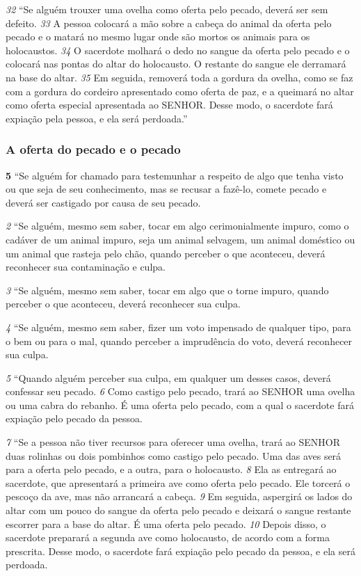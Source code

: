 \smallskip
\textit{\tiny 32}
“Se alguém trouxer uma ovelha como oferta pelo pecado, deverá ser sem
defeito. 
\textit{\tiny 33}
A pessoa colocará a mão sobre a cabeça do animal da oferta pelo
pecado e o matará no mesmo lugar onde são mortos os animais para os
holocaustos. 
\textit{\tiny 34}
O sacerdote molhará o dedo no sangue da oferta pelo pecado e o
colocará nas pontas do altar do holocausto. O restante do sangue ele derramará
na base do altar. 
\textit{\tiny 35}
Em seguida, removerá toda a gordura da ovelha, como se faz
com a gordura do cordeiro apresentado como oferta de paz, e a queimará no altar
como oferta especial apresentada ao SENHOR. Desse modo, o sacerdote fará
expiação pela pessoa, e ela será perdoada.”

\bigskip
\subsubsection*{A oferta do pecado e o pecado}
\textbf{\large 5} “Se alguém for chamado para testemunhar a respeito de algo que tenha visto
ou que seja de seu conhecimento, mas se recusar a fazê-lo, comete pecado e
deverá ser castigado por causa de seu pecado. 

\smallskip
\textit{\tiny 2} 
“Se alguém, mesmo sem saber, tocar em algo cerimonialmente impuro, como
o cadáver de um animal impuro, seja um animal selvagem, um animal doméstico
ou um animal que rasteja pelo chão, quando perceber o que aconteceu, deverá
reconhecer sua contaminação e culpa. 

\smallskip
\textit{\tiny 3} 
“Se alguém, mesmo sem saber, tocar em algo que o torne impuro, quando
perceber o que aconteceu, deverá reconhecer sua culpa. 

\smallskip
\textit{\tiny 4} 
“Se alguém, mesmo sem saber, fizer um voto impensado de qualquer tipo,
para o bem ou para o mal, quando perceber a imprudência do voto, deverá
reconhecer sua culpa. 

\smallskip
\textit{\tiny 5} 
“Quando alguém perceber sua culpa, em qualquer um desses casos, deverá
confessar seu pecado. 
\textit{\tiny 6} 
Como castigo pelo pecado, trará ao SENHOR uma ovelha ou
uma cabra do rebanho. É uma oferta pelo pecado, com a qual o sacerdote fará
expiação pelo pecado da pessoa. 

\smallskip
\textit{\tiny 7} 
“Se a pessoa não tiver recursos para oferecer uma ovelha, trará ao SENHOR duas
rolinhas ou dois pombinhos como castigo pelo pecado. Uma das aves será para a
oferta pelo pecado, e a outra, para o holocausto. 
\textit{\tiny 8} 
Ela as entregará ao sacerdote,
que apresentará a primeira ave como oferta pelo pecado. Ele torcerá o pescoço da
ave, mas não arrancará a cabeça. 
\textit{\tiny 9} 
Em seguida, aspergirá os lados do altar com um
pouco do sangue da oferta pelo pecado e deixará o sangue restante escorrer para
a base do altar. É uma oferta pelo pecado. 
\textit{\tiny 10}
Depois disso, o sacerdote preparará a
segunda ave como holocausto, de acordo com a forma prescrita. Desse modo, o
sacerdote fará expiação pelo pecado da pessoa, e ela será perdoada.
   
